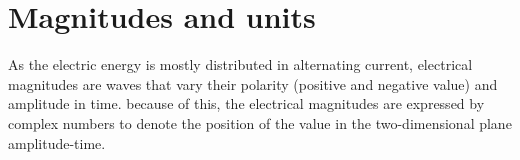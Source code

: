 \documentclass[nols,a4paper,twoside,notoc,fleqn]{tufte-book}
\begin{document}
%
%
%
%
%

\chapter{Magnitudes and units}

As the electric energy is mostly distributed in alternating current, electrical magnitudes are waves that vary their polarity (positive and negative value) and amplitude in time. because of this, the electrical magnitudes are expressed by complex numbers to denote the position of the value in the two-dimensional plane amplitude-time. 
\end{document}
